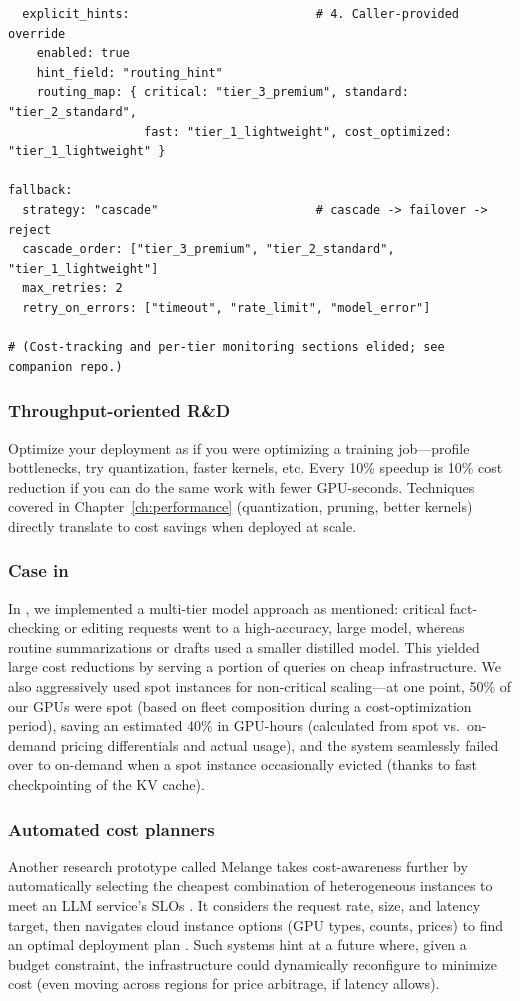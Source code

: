 \begin{codebox}
\begin{verbatim}
  explicit_hints:                          # 4. Caller-provided override
    enabled: true
    hint_field: "routing_hint"
    routing_map: { critical: "tier_3_premium", standard: "tier_2_standard",
                   fast: "tier_1_lightweight", cost_optimized: "tier_1_lightweight" }

fallback:
  strategy: "cascade"                      # cascade -> failover -> reject
  cascade_order: ["tier_3_premium", "tier_2_standard", "tier_1_lightweight"]
  max_retries: 2
  retry_on_errors: ["timeout", "rate_limit", "model_error"]

# (Cost-tracking and per-tier monitoring sections elided; see companion repo.)
\end{verbatim}
\end{codebox}

\subsubsection{Throughput-oriented R\&D}
Optimize your deployment as if you were optimizing a training job---profile bottlenecks, try quantization, faster kernels, etc. Every 10\% speedup is 10\% cost reduction if you can do the same work with fewer GPU-seconds. Techniques covered in Chapter~\ref{ch:performance} (quantization, pruning, better kernels) directly translate to cost savings when deployed at scale.

\subsubsection{Case in \ishtar{}}
In \ishtar{}, we implemented a multi-tier model approach as mentioned: critical fact-checking or editing requests went to a high-accuracy, large model, whereas routine summarizations or drafts used a smaller distilled model. This yielded large cost reductions by serving a portion of queries on cheap infrastructure. We also aggressively used spot instances for non-critical scaling---at one point, 50\% of our GPUs were spot (based on fleet composition during a cost-optimization period), saving an estimated 40\% in GPU-hours (calculated from spot vs.\ on-demand pricing differentials and actual usage), and the system seamlessly failed over to on-demand when a spot instance occasionally evicted (thanks to fast checkpointing of the KV cache).

\subsubsection{Automated cost planners}
Another research prototype called Melange takes cost-awareness further by automatically selecting the cheapest combination of heterogeneous instances to meet an LLM service's SLOs \cite{pope2023exegpt}. It considers the request rate, size, and latency target, then navigates cloud instance options (GPU types, counts, prices) to find an optimal deployment plan \cite{pope2023exegpt}. Such systems hint at a future where, given a budget constraint, the infrastructure could dynamically reconfigure to minimize cost (even moving across regions for price arbitrage, if latency allows).

